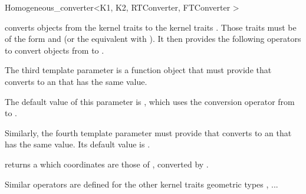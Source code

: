 \begin{ccRefClass}{Homogeneous_converter<K1, K2, RTConverter, FTConverter >}

\KernelRefLayout\gdef\ccTagOperatorLayout{\ccFalse}

\ccDefinition

\ccClassTemplateName converts objects from the kernel traits  to
the kernel traits .  Those traits must be of the form
 and  (or the equivalent with
).  It then provides the following operators to
convert objects from  to .

The third template parameter  is a function object that must
provide  that 
converts  to an  that has the same value.

The default value of this parameter is ,
which uses the conversion operator from
 to .

Similarly, the fourth template parameter must provide
 that
converts  to an  that has the same value.  Its
default value is  .


\ccCreation
{}


\ccOperations

{ returns a  which coordinates are those of ,
converted by .}

Similar operators are defined for the other kernel traits geometric types
, ...

\ccSeeAlso
{} \\
 \\

\end{ccRefClass}

